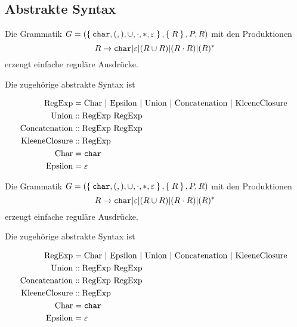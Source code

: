\subsection{Abstrakte Syntax}%
\begin{beispiel}
    Die Grammatik $G = (\Set{\text{\texttt{char}}, (, ), \cup, \cdot, *, \varepsilon}, \Set{R}, P, R)$ mit den Produktionen
    \[R \rightarrow \text{\texttt{char}} | \varepsilon | ( R \cup R ) | (R \cdot R) | (R)^*\]
    erzeugt einfache reguläre Ausdrücke.

    Die zugehörige abstrakte Syntax ist

    \begin{align*}
        \text{RegExp} &= \text{Char } | \text{ Epsilon } | \text{ Union } | \text{ Concatenation } | \text{ KleeneClosure }\\
        \text{Union} &:: \text{RegExp RegExp}\\
        \text{Concatenation} &:: \text{RegExp RegExp}\\
        \text{KleeneClosure} &:: \text{RegExp}\\
        \text{Char} &= \text{\texttt{char}}\\
        \text{Epsilon} &= \varepsilon\\
    \end{align*}
\end{beispiel}

\begin{beispiel}
    Die Grammatik $G = (\Set{\text{\texttt{char}}, (, ), \cup, \cdot, *, \varepsilon}, \Set{R}, P, R)$ mit den Produktionen
    \[R \rightarrow \text{\texttt{char}} | \varepsilon | ( R \cup R ) | (R \cdot R) | (R)^*\]
    erzeugt einfache reguläre Ausdrücke.

    Die zugehörige abstrakte Syntax ist

    \begin{align*}
        \text{RegExp} &= \text{Char } | \text{ Epsilon } | \text{ Union } | \text{ Concatenation } | \text{ KleeneClosure }\\
        \text{Union} &:: \text{RegExp RegExp}\\
        \text{Concatenation} &:: \text{RegExp RegExp}\\
        \text{KleeneClosure} &:: \text{RegExp}\\
        \text{Char} &= \text{\texttt{char}}\\
        \text{Epsilon} &= \varepsilon\\
    \end{align*}
\end{beispiel}

